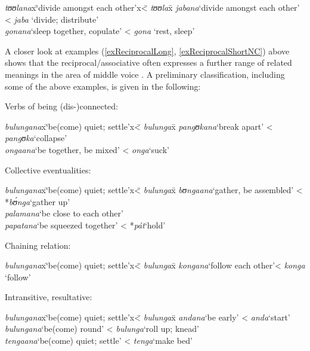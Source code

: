 \begin{exe}
	\ex\begin{tabbing}
		\textit{tʊʊlana}x\=\lq divide amongst each other'x\= < \textit{tʊʊla}x\=\kill%
		\textit{jabana}\>\lq divide amongst each other' \> < \textit{jaba} \> \lq divide; distribute'\\
		\textit{gonana}\>\lq sleep together, copulate' \> < \textit{gona} \> \lq rest, sleep'
	\end{tabbing}
\end{exe}

A closer look at examples (\ref{exReciprocalLong}, \ref{exReciprocalShortNC}) above shows that the reciprocal/associative often expresses a further range of related meanings in the area of middle voice \citep{KemmerS1993}. A preliminary classification, including some of the above examples, is given in the following:
\begin{exe}
	\ex\label{exReciprocalMiddle}\begin{xlist}
		\ex Verbs of being (dis-)connected:
		\begin{tabbing}
			\textit{bulungana}x\=\lq be(come) quiet; settle'x\= < \textit{bulunga}x\=\kill%
			\textit{pangʊkana}\>`break apart'\> < \textit{pangʊka}\>`collapse'\\
			\textit{ongaana}\>`be together, be mixed'\> < \textit{onga}\>`suck'
		\end{tabbing}
		\ex Collective eventualities:
		\begin{tabbing}
			\textit{bulungana}x\=\lq be(come) quiet; settle'x\= < \textit{bulunga}x\=\kill%
			\textit{bʊngaana}\>`gather, be assembled'\> < *\textit{bʊ́nga}\>`gather up'\\
			\textit{palamana}\>`be close to each other'\\
			\textit{papatana}\>`be squeezed together'\> < *\textit{pát}\>`hold'
		\end{tabbing}
		\ex Chaining relation:
		\begin{tabbing}
			\textit{bulungana}x\=\lq be(come) quiet; settle'x\= < \textit{bulunga}x\=\kill%
			\textit{kongana}\>\lq follow each other'\>< \textit{konga} \>\lq follow'
		\end{tabbing}
	
	\clearpage
	
		\ex Intransitive, resultative:\footnotemark
		\begin{tabbing}
			\textit{bulungana}x\=\lq be(come) quiet; settle'x\= < \textit{bulunga}x\=\kill%
			\textit{andana}\>`be early'\> < \textit{anda}\>`start'\\
			\textit{bulungana}\>`be(come) round'\> < \textit{bulunga}\>`roll up; knead'\\
			\textit{tengaana}\>\lq be(come) quiet; settle'\> < \textit{tenga}\>`make bed'
		\end{tabbing}
	\end{xlist}
\end{exe}
